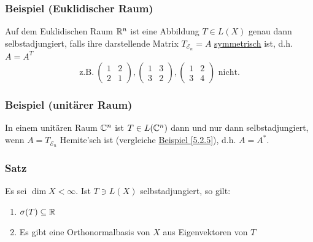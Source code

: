 \subsubsection{Beispiel (Euklidischer Raum)}
Auf dem Euklidischen Raum $\mathbb{R} ^n$ ist eine Abbildung $T\in L(X)$ genau dann selbstadjungiert, falls ihre darstellende Matrix $T_{\mathcal{E}_n}=A$ \underline{symmetrisch} ist, d.h. $A=A^T$
\[\text{z.B.}\ \begin{pmatrix}1 & 2\\ 2 & 1\end{pmatrix},\begin{pmatrix}1 & 3\\ 3 & 2\end{pmatrix}, \begin{pmatrix}1 & 2\\ 3 & 4\end{pmatrix}\text{ nicht.}\]
\subsubsection{Beispiel (unitärer Raum)}
In einem unitären Raum $\mathbb{C} ^n$ ist $T\in L(\mathbb{C} ^n)$ dann und nur dann selbstadjungiert, wenn $A=T_{\mathcal{E}_n}$ Hemite'sch ist (vergleiche \hyperref[5.2.5]{Beispiel \ref{5.2.5}}), d.h. $A=A^*$.
\addtocounter{subsubsection}{1}
\subsubsection{Satz}
Es sei $\dim X<\infty$.  Ist $T\ni L(X)$ selbstadjungiert, so gilt:
\alphabet
\begin{enumerate}
\item $\sigma (T)\subseteq \mathbb{R}$
\item Es gibt eine Orthonormalbasis von $X$ aus Eigenvektoren von $T$
\end{enumerate}

